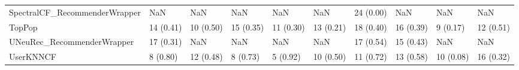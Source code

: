 \begin{tabular}{llllllllll}
      SpectralCF\_RecommenderWrapper &                      NaN &         NaN &           NaN &          NaN &                  NaN &           24 (0.00) &               NaN &                NaN &               NaN \\
                             TopPop &                14 (0.41) &   10 (0.50) &     15 (0.35) &    11 (0.30) &            13 (0.21) &           18 (0.40) &         16 (0.39) &           9 (0.17) &         12 (0.51) \\
         UNeuRec\_RecommenderWrapper &                17 (0.31) &         NaN &           NaN &          NaN &                  NaN &           17 (0.54) &         15 (0.43) &                NaN &               NaN \\
                          UserKNNCF &                 8 (0.80) &   12 (0.48) &      8 (0.73) &     5 (0.92) &            10 (0.50) &           11 (0.72) &         13 (0.58) &          10 (0.08) &         16 (0.32) \\
\bottomrule
\end{tabular}
